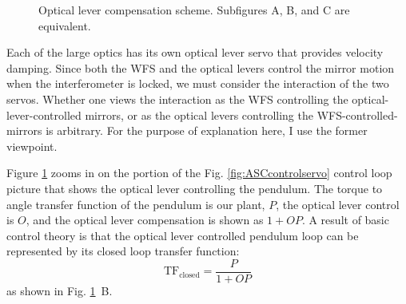 \begin{figure} 
\begin{centering} 
  
\caption[Optical lever compensation scheme]{Optical lever compensation scheme. Subfigures A, B, and C are equivalent.}  
\label{fig:OLcomp} 
\end{centering} 
\end{figure}

\label{sec:oplevcomp}
Each of the large optics has its own optical lever servo that provides velocity damping. Since both the WFS and the optical levers control the mirror motion when the interferometer is locked, we must consider the interaction of the two servos. Whether one views the interaction as the WFS controlling the optical-lever-controlled mirrors, or as the optical levers controlling the WFS-controlled-mirrors is arbitrary. For the purpose of explanation here, I use the former viewpoint.

Figure \ref{fig:OLcomp} zooms in on the portion of the Fig. \ref{fig:ASCcontrolservo} control loop picture that shows the optical lever controlling the pendulum. The torque to angle transfer function of the pendulum is our plant, $P$, the optical lever control is $O$, and the optical lever compensation is shown as $1+OP$. A result of basic control theory is that the optical lever controlled pendulum loop can be represented by its closed loop transfer function:
\begin{equation}
\mathrm{TF_{closed}} = \frac{P}{1+OP}
\end{equation}
as shown in Fig. \ref{fig:OLcomp}~B. 

